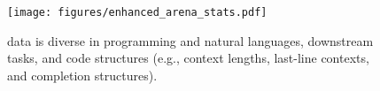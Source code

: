 \begin{figure}[t]
    \small
    \centering
    \texttt{[image: figures/enhanced\_arena\_stats.pdf]}
    \vspace{-0.5cm}
    \caption{\systemName data is diverse in programming and natural languages, downstream tasks, and code structures (e.g., context lengths, last-line contexts, and completion structures). 
    }
    \label{fig:user_stats}
\end{figure}

